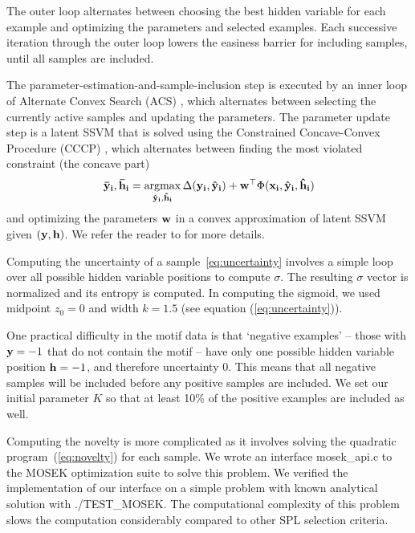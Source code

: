 \documentclass{article}
\newcommand{\argmax}{\operatornamewithlimits{argmax}}
\newcommand{\mthb }{\begin{eqnarray*} }
\newcommand{\mthe }{\end {eqnarray*} }
\begin{document}

The outer loop alternates between choosing the best hidden variable for each example and optimizing the parameters and selected examples.  Each successive iteration through the outer loop lowers the easiness barrier for including samples, until all samples are included.

The parameter-estimation-and-sample-inclusion step is executed by an inner loop of Alternate Convex Search ({\sc ACS}) \cite{SPL}, which alternates between selecting the currently active samples and updating the parameters.  The parameter update step is a latent SSVM that is solved using the Constrained Concave-Convex Procedure ({\sc CCCP}) \cite{SSVM}, which alternates between finding the most violated constraint (the concave part)
\mthb
{\bf\bar y_i,\bf\bar h_i} = \argmax_{{\bf\hat y_i},{\bf\hat h_i}} \Delta({\bf y_i,\bf\hat y_i})+{\bf w}^\top\Phi(\bf x_i,\bf\hat y_i,\bf\hat h_i)
\mthe
and optimizing the parameters $\bf w$ in a convex approximation of latent SSVM given $(\bf y, \bf h)$.  We refer the reader to \cite{SSVM} for more details.

Computing the uncertainty of a sample~\ref{eq:uncertainty} involves a simple loop over all possible hidden variable positions to compute $\sigma$.  The resulting $\sigma$ vector is normalized and its entropy is computed.  In computing the sigmoid, we used midpoint $z_0=0$ and width $k=1.5$ (see equation (\ref{eq:uncertainty})).

One practical difficulty in the motif data is that `negative examples' -- those with ${\bf y}=-1$ that do not contain the motif -- have only one possible hidden variable position ${\bf h}=-1$, and therefore uncertainty 0.  This means that all negative samples will be included before any positive samples are included.  We set our initial parameter $K$ so that at least 10\% of the positive examples are included as well. 

Computing the novelty is more complicated as it involves solving the quadratic program~(\ref{eq:novelty}) for each sample.  We wrote an interface {\sc mosek\_api.c} to the MOSEK optimization suite \cite{Mosek} to solve this problem.  We verified the implementation of our interface on a simple problem with known analytical solution with {\sc ./TEST\_MOSEK}.  The computational complexity of this problem slows the computation considerably compared to other SPL selection criteria.
\end{document}
